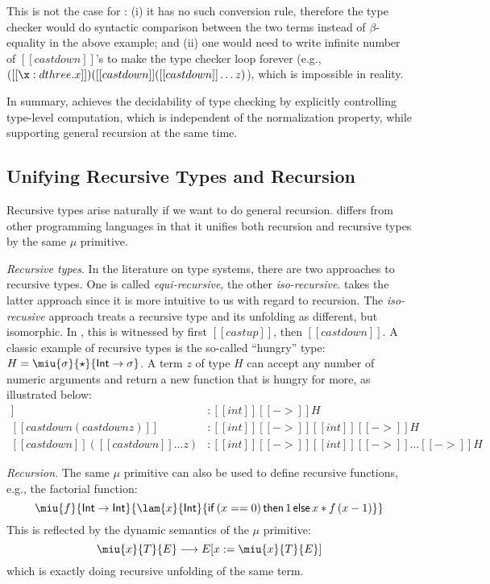 This is not the case for \name: (i) it has no such conversion rule, therefore the type checker would do syntactic comparison between the two terms instead of $\beta$-equality in the above example; and (ii) one would need to write infinite number of $[[castdown]]$'s to make the type checker loop forever (e.g., $([[\x:d three.x]])([[castdown]]([[castdown]] \dots z) $), which is impossible in reality.

In summary, \name achieves the decidability of type checking by explicitly controlling type-level computation, which is independent of the normalization property, while supporting general recursion at the same time.

\subsection{Unifying Recursive Types and Recursion}


Recursive types arise naturally if we want to do general recursion. \name differs from other programming languages in that it unifies both recursion and recursive types by the same $\mu$ primitive.

\emph{Recursive types}. In the literature on type systems, there are two approaches to recursive types. One is called \emph{equi-recursive}, the other \emph{iso-recursive}. \name takes the latter approach since it is more intuitive to us with regard to recursion. The \emph{iso-recusive} approach treats a recursive type and its unfolding as different, but isomorphic. In \name, this is witnessed by first $[[castup]]$, then $[[castdown]]$. A classic example of recursive types is the so-called ``hungry'' type: $H = \miu{\sigma}{\star}{\mathsf{Int} \rightarrow \sigma}$. A term $z$ of type $H$ can accept any number of numeric arguments and return a new function that is hungry for more, as illustrated below:
\begin{align*}
[[castdown z]] &: [[int]][[->]]H  \\
[[castdown(castdown z)]] &: [[int]][[->]][[int]][[->]]H \\
[[castdown]]([[castdown]] \dots z) &: [[int]][[->]][[int]][[->]]\dots[[->]]H
\end{align*}

\emph{Recursion}. The same $\mu$ primitive can also be used to define recursive functions, e.g., the factorial function: \[\miu{f}{\mathsf{Int} \rightarrow \mathsf{Int}}{\lam{x}{\mathsf{Int}}{\mathsf{if}\,(x == 0)\,\mathsf{then}\,1\,\mathsf{else}\,x * f\,(x - 1)}}\] This is reflected by the dynamic semantics of the $\mu$ primitive:
\[\miu{x}{T}{E} \longrightarrow E[x:=\miu{x}{T}{E}]\]
which is exactly doing recursive unfolding of the same term.

